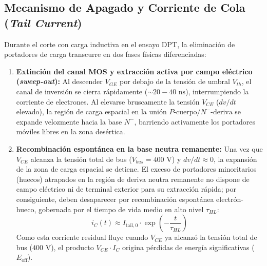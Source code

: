 \documentclass[11pt,a4paper]{article}
\begin{document}
\subsection{Mecanismo de Apagado y Corriente de Cola (\textit{Tail Current})}
Durante el corte con carga inductiva en el ensayo DPT, la eliminación de portadores de carga transcurre en dos fases físicas diferenciadas:
\begin{enumerate}[leftmargin=*, noitemsep, topsep=2pt]
  \item \textbf{Extinción del canal MOS y extracción activa por campo eléctrico (\textit{sweep-out}):} Al descender $V_{GE}$ por debajo de la tensión de umbral $V_{th}$, el canal de inversión se cierra rápidamente ($\sim 20-40\text{ ns}$), interrumpiendo la corriente de electrones. Al elevarse bruscamente la tensión $V_{CE}$ ($dv/dt$ elevado), la región de carga espacial en la unión $P\text{-cuerpo} / N^-\text{-deriva}$ se expande velozmente hacia la base $N^-$, barriendo activamente los portadores móviles libres en la zona desértica.
  \item \textbf{Recombinación espontánea en la base neutra remanente:} Una vez que $V_{CE}$ alcanza la tensión total de bus ($V_{bus} = 400\text{ V}$) y $dv/dt \approx 0$, la expansión de la zona de carga espacial se detiene. El exceso de portadores minoritarios (huecos) atrapados en la región de deriva neutra remanente no dispone de campo eléctrico ni de terminal exterior para su extracción rápida; por consiguiente, deben desaparecer por recombinación espontánea electrón-hueco, gobernada por el tiempo de vida medio en alto nivel $\tau_{HL}$:
  \begin{equation}
    i_C(t) \approx I_{\text{tail},0} \cdot \exp\left(-\frac{t}{\tau_{HL}}\right)
  \end{equation}
  Como esta corriente residual fluye cuando $V_{CE}$ ya alcanzó la tensión total de bus ($400\text{ V}$), el producto $V_{CE} \cdot I_C$ origina pérdidas de energía significativas ($E_{\text{off}}$).
\end{enumerate}
\end{document}
